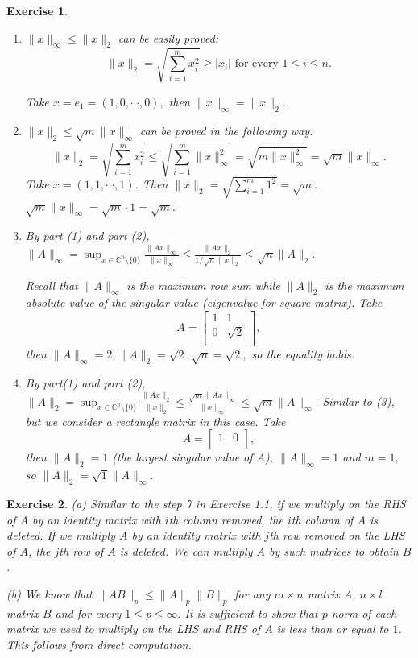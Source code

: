 \documentclass[paper=a4, fontsize=11pt]{scrartcl} %
\numberwithin{equation}{section} %
\numberwithin{figure}{section} %
\numberwithin{table}{section} %
\newtheorem{exercise}{Exercise}
\numberwithin{exercise}{section}
\begin{document}
\begin{exercise}
\begin{enumerate}

\item $\|x\|_{\infty} \leq \|x\|_2$ can be easily proved:
$$ \|x\|_2=\sqrt{\sum_{i=1}^m x_i^2} \geq |x_i| \mbox{ for  every }  1\leq i\leq n.$$

Take $x=e_1=(1,0,\cdots,0),$ then $\|x\|_{\infty} = \|x\|_2.$
\item  $\|x\|_{2} \leq \sqrt{m}\|x\|_{\infty}$ can be proved in the following way:
$$ \|x\|_2=\sqrt{\sum_{i=1}^m x_i^2} \leq  \sqrt{\sum_{i=1}^m \|x\|_{\infty}^2 }=\sqrt{m \|x\|_{\infty}^2 }=\sqrt{m}\|x\|_{\infty}.$$
Take $x=(1,1,\cdots,1)$. Then $\|x\|_2=\sqrt{\sum_{i=1}^m 1^2}=\sqrt{m}.$ $\sqrt{m}\|x\|_{\infty}=\sqrt{m}\cdot 1=\sqrt{m}.$

\item By part (1) and part (2), $\|A\|_{\infty}=\sup_{x\in\mathbb{C}^n\setminus\{ 0\}} \frac{\|Ax\|_{\infty}}{\|x\|_{\infty}}\leq \frac{\|Ax\|_2}{1/\sqrt{n}\|x\|_2}\leq \sqrt{n} \|A\|_2.$

Recall that $\|A\|_{\infty}$ is the maximum row sum while $\|A\|_2$ is the maximum absolute value of the singular value (eigenvalue for square matrix). 
Take $$A=\begin{bmatrix}
1 & 1\\
0 & \sqrt{2} \\
\end{bmatrix},$$ then $\|A\|_{\infty}=2, \|A\|_{2}=\sqrt{2}, \sqrt{n}=\sqrt{2},$ so the equality holds.
\item By part(1) and part (2),  $\|A\|_{2}=\sup_{x\in\mathbb{C}^n\setminus\{ 0\}} \frac{\|Ax\|_{2}}{\|x\|_{2}}\leq \frac{\sqrt{m} \|Ax\|_{\infty}}{ \|x\|_{\infty}}\leq \sqrt{m} \|A\|_{\infty}.$
Similar to (3), but we consider a rectangle matrix in this case. Take 
$$A=\begin{bmatrix}
1  & 0\\
\end{bmatrix},$$ then $\|A\|_2=1$ (the largest singular value of $A$), $\|A\|_{\infty}=1$ and $m=1,$ so 
$\|A\|_2=\sqrt{1} \|A\|_{\infty}.$
\end{enumerate}
\end{exercise}

\begin{exercise}
(a) Similar to the step 7 in Exercise 1.1, if we multiply on the RHS of $A$ by an identity matrix with $i$th column removed, the $i$th column of $A$ is deleted. If we multiply $A$ by an identity matrix with $j$th row removed on the LHS of $A$, the $j$th row of $A$ is deleted. We can multiply $A$ by such matrices to obtain $B$.

(b) We know that $\| AB\|_{p}\leq \|A\|_{p}\|B\|_{p}$ for any $m\times n$ matrix $A$, $n\times l$ matrix $B$ and for every $1\leq p\leq \infty.$ It is sufficient to show that $p$-norm of each matrix we used to multiply on the LHS and RHS of $A$ is less than or equal to $1$. This follows from direct computation.
\end{exercise}
\end{document}
